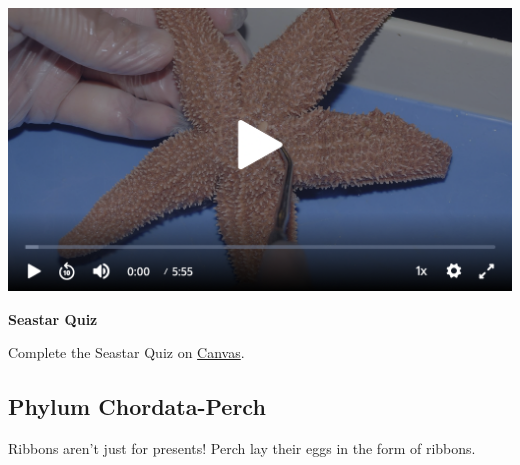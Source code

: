 \documentclass[
]{book}
\begin{document}
\includegraphics{images/Lab6_Seastar_Dissection_Video1.png}

\textbf{Seastar Quiz}

Complete the Seastar Quiz on \href{https://canvas.ubc.ca/}{Canvas}.

\hypertarget{phylum-chordata-perch-1}{%
\subsection*{Phylum Chordata-Perch}\label{phylum-chordata-perch-1}}

Ribbons aren't just for presents! Perch lay their eggs in the form of ribbons.
\end{document}
